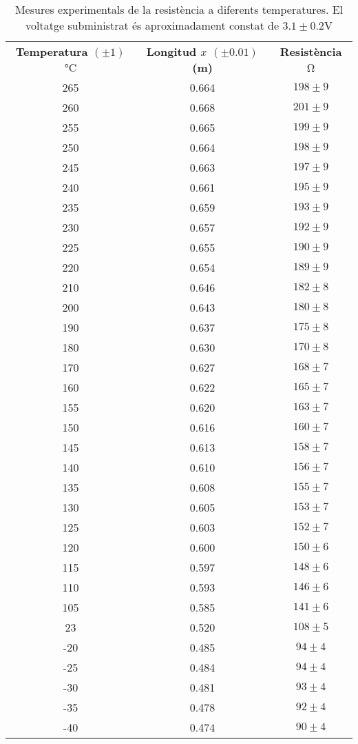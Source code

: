 \begin{table} 
	\centering
	\caption{Mesures experimentals de la resistència a diferents temperatures. El voltatge subministrat és aproximadament constat de $3.1\pm0.2\si{\volt}$}
	\begin{tabular}{|c|c|c|}
\textbf{Temperatura $(\pm1)$} \si{\celsius} & \textbf{Longitud $x$ $(\pm0.01)$(\si{\meter})} & \textbf{Resistència} \si{\ohm} \\
265 & 0.664 & $198\pm9$\\
260 & 0.668 & $201\pm9$\\
255 & 0.665 & $199\pm9$\\
250 & 0.664 & $198\pm9$\\
245 & 0.663 & $197\pm9$\\
240 & 0.661 & $195\pm9$\\
235 & 0.659 & $193\pm9$\\
230 & 0.657 & $192\pm9$\\
225 & 0.655 & $190\pm9$\\
220 & 0.654 & $189\pm9$\\
210 & 0.646 & $182\pm8$\\
200 & 0.643 & $180\pm8$\\
190 & 0.637 & $175\pm8$\\
180 & 0.630 & $170\pm8$\\
170 & 0.627 & $168\pm7$\\
160 & 0.622 & $165\pm7$\\
155 & 0.620 & $163\pm7$\\
150 & 0.616 & $160\pm7$\\
145 & 0.613 & $158\pm7$\\
140 & 0.610 & $156\pm7$\\
135 & 0.608 & $155\pm7$\\
130 & 0.605 & $153\pm7$\\
125 & 0.603 & $152\pm7$\\
120 & 0.600 & $150\pm6$\\
115 & 0.597 & $148\pm6$\\
110 & 0.593 & $146\pm6$\\
105 & 0.585 & $141\pm6$\\
23 & 0.520 & $108\pm5$\\
-20 & 0.485 & $94\pm4$\\
-25 & 0.484 & $94\pm4$\\
-30 & 0.481 & $93\pm4$\\
-35 & 0.478 & $92\pm4$\\
-40 & 0.474 & $90\pm4$\\

\end{tabular}
\end{table}
